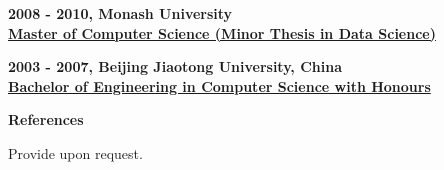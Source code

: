 \documentclass[a4paper,8pt,final]{memoir}
\newcommand{\Sep}{\vspace{1.5em}}
\newcommand{\SmallSep}{\vspace{0.5em}}
\newcommand{\CVSection}[1]
	{\Large\textbf{#1}\par
	\SmallSep\normalsize\normalfont}
\newcommand{\CVItem}[1]
	{\textbf{\color{RoyalBlue} #1}}
\begin{document}
\CVItem{2008 - 2010, Monash University}\\
\underline{\textbf{Master of Computer Science (Minor Thesis in Data Science)}}
\Sep

\CVItem{2003 - 2007, Beijing Jiaotong University, China}\\
\underline{\textbf{Bachelor of Engineering in Computer Science with Honours}}
\Sep
\Sep
\Sep

\CVSection{References}
Provide upon request.
%
%
%


\end{document}

